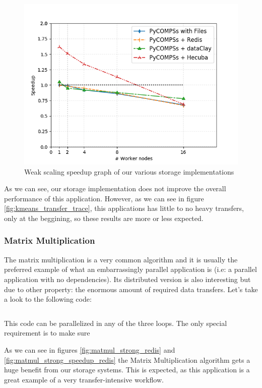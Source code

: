 \begin{figure}[ht!]
\centering
\includegraphics[scale = 0.5]{figures/storage/kmeans_weak_speedup.png}
\caption{Weak scaling speedup graph of our various storage implementations}
\label{fig:kmeans_weak_speedup_redis}
\end{figure}

As we can see, our storage implementation does not improve the overall performance of this application. However, as we can see in figure \ref{fig:kmeans_transfer_trace}, this applications has little to no heavy transfers, only at the beggining, so these results are more or less expected.



\subsubsection{Matrix Multiplication}
\label{subsubsec:matmul_redis}
The matrix multiplication is a very common algorithm and it is usually the preferred example of what an embarrassingly parallel application is (i.e: a parallel application with no dependencies). Its distributed version is also interesting but due to other property: the enormous amount of required data transfers. Let's take a look to the following code:

\inputminted{python}{snippets/matmul_python.py}

This code can be parallelized in any of the three loops. The only special requirement is to make sure 



As we can see in figures \ref{fig:matmul_strong_redis} and \ref{fig:matmul_strong_speedup_redis} the Matrix Multiplication algorithm gets a huge benefit from our storage systems. This is expected, as this application is a great example of a very transfer-intensive workflow.

